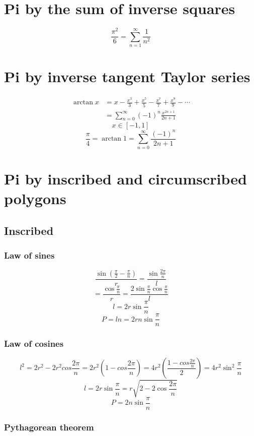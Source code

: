 \documentclass{article}
\begin{document}
\section{Pi by the sum of inverse squares}

$$\frac{\pi^2}{6} = \sum_{n=1}^{\infty}\frac{1}{n^2}$$

\section{Pi by inverse tangent Taylor series}

\begin{align*}
\arctan x &= x - \frac{x^3}{3} + \frac{x^5}{5} - \frac{x^7}{7} + \frac{x^9}{9} - \cdots \\
          &= \sum_{n=0}^{\infty} (-1)^n \frac{x^{2n + 1}}{2n + 1}
\end{align*}
$$x \in [-1, 1]$$
$$\frac{\pi}{4} = \arctan 1
= \sum_{n=0}^{\infty} \frac{(-1)^n}{2n + 1}$$

\section{Pi by inscribed and circumscribed polygons}

\subsection{Inscribed}

\subsubsection{Law of sines}

$$\frac{\sin(\frac{\pi}{2}-\frac{\pi}{n})}{r} = \frac{\sin\frac{2\pi}{n}}{l}$$
$$= \frac{\cos\frac{\pi}{n}}{r} = \frac{2\sin\frac{\pi}{n}\cos\frac{\pi}{n}}{l}$$
$$l = 2r\sin\frac{\pi}{n}$$
$$P = ln
= 2rn\sin\frac{\pi}{n}$$

\subsubsection{Law of cosines}

$$l^2 = 2r^2 - 2r^2cos\frac{2\pi}{n}
= 2r^2\left(1 - cos\frac{2\pi}{n}\right)
= 4r^2\left(\frac{1 - cos\frac{2\pi}{n}}{2}\right)
= 4r^2\sin^2{\frac{\pi}{n}}$$
$$l = 2r\sin\frac{\pi}{n} = r\sqrt{2 - 2\cos\frac{2\pi}{n}}$$
$$P = 2n\sin\frac{\pi}{n}$$

\subsubsection{Pythagorean theorem}
\end{document}

